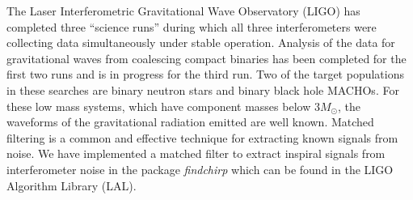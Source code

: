 The Laser Interferometric Gravitational Wave Observatory
(LIGO)\cite{Barish:1999} has completed three ``science runs'' during which all
three interferometers were collecting data simultaneously under stable
operation. Analysis of the data for gravitational waves from coalescing
compact binaries has been completed for the first two
runs\cite{LIGOS1iul,LIGOS2iul} and is in progress for the third run. Two of
the target populations in these searches are binary neutron
stars\cite{thorne.k:1987} and binary black hole
MACHOs\cite{Finn:1996dd,Nakamura:1997sm}. For these low mass systems, which
have component masses below $3 M_\odot$, the waveforms of the gravitational
radiation emitted are well known\cite{Blanchet:1995ez,Blanchet:1996pi}.
Matched filtering is a common and effective technique for extracting known
signals from noise\cite{wainstein:1962}. We have implemented a matched filter
to extract inspiral signals from interferometer noise in the package
\emph{findchirp} which can be found in the LIGO Algorithm Library
(LAL)\cite{LAL}.

